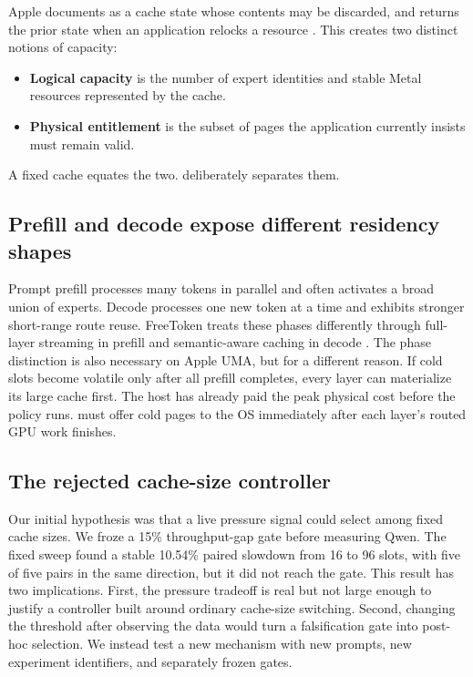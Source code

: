 Apple documents  as a cache state whose
contents may be discarded, and  returns the prior state
when an application relocks a resource \cite{apple2026purgeable}. This creates
two distinct notions of capacity:

\begin{itemize}
  \item \textbf{Logical capacity} is the number of expert identities and stable
  Metal resources represented by the cache.
  \item \textbf{Physical entitlement} is the subset of pages the application
  currently insists must remain valid.
\end{itemize}

A fixed cache equates the two. \system deliberately separates them.

\subsection{Prefill and decode expose different residency shapes}

Prompt prefill processes many tokens in parallel and often activates a broad
union of experts. Decode processes one new token at a time and exhibits stronger
short-range route reuse. FreeToken treats these phases differently through
full-layer streaming in prefill and semantic-aware caching in decode
\cite{yang2026freetoken}. The phase distinction is also necessary on Apple UMA,
but for a different reason. If cold slots become volatile only after all
prefill completes, every layer can materialize its large cache first. The host
has already paid the peak physical cost before the policy runs. \system must
offer cold pages to the OS immediately after each layer's routed GPU work
finishes.

\subsection{The rejected cache-size controller}

Our initial hypothesis was that a live pressure signal could select among fixed
cache sizes. We froze a 15\% throughput-gap gate before measuring Qwen. The
fixed sweep found a stable 10.54\% paired slowdown from 16 to 96 slots, with
five of five pairs in the same direction, but it did not reach the gate. This
result has two implications. First, the pressure tradeoff is real but not large
enough to justify a controller built around ordinary cache-size switching.
Second, changing the threshold after observing the data would turn a
falsification gate into post-hoc selection. We instead test a new mechanism
with new prompts, new experiment identifiers, and separately frozen gates.

